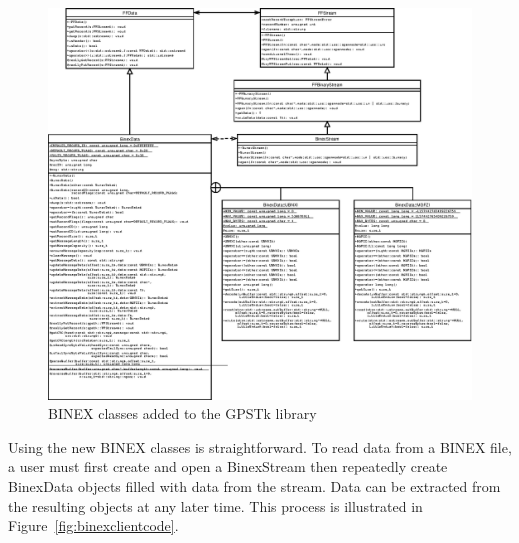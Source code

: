 \documentclass{ion-gps}
\begin{document}
\begin{figure}[htbp]
  \centering
  \includegraphics{binexgpstk}
  \caption{BINEX classes added to the GPSTk library}
  \label{fig:binexclasses}
\end{figure}


Using the new BINEX classes is straightforward.  To read data from a
BINEX file, a user must first create and open a BinexStream then
repeatedly create BinexData objects filled with data from the stream.
Data can be extracted from the resulting objects at any later time.
This process is illustrated in Figure~\ref{fig:binexclientcode}.
\end{document}

